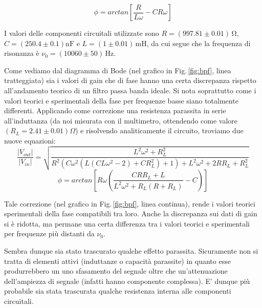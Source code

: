 \begin{equation}
\phi=arctan\left[\frac{R}{L \omega}-C R \omega \right]
\label{eq:bpfPhi}
\end{equation}

\noindent I valori delle componenti circuitali utilizzate sono $R=(997.81 \pm 0.01)\,\si{\ohm}$, $C=(250.4 \pm 0.1)\si{\nano\farad}$ e $L=(1 \pm 0.01)\,\si{\milli\henry}$, da cui segue che la frequenza di risonanza è $\nu_0 = (10060 \pm 50)\,\si{\hertz}$.

Come vediamo dal diagramma di Bode (nel grafico in Fig.$\,$\ref{fig:bpf}, linea tratteggiata) sia i valori di gain che di fase hanno una certa discrepanza rispetto all'andamento teorico di un filtro passa banda ideale. Si nota soprattutto come i valori teorici e sperimentali della fase per frequenze basse siano totalmente differenti.
Applicando come correzione una resistenza parassita in serie all'induttanza (da noi misurata con il multimetro, ottendendo come valore $(R_L=2.41\pm 0.01) \Omega$) e risolvendo analiticamente il circuito, troviamo due nuove equazioni:\\

\noindent
\begin{equation}
\frac{|V_{out}|}{|V_{in}|}=\sqrt{\frac{L^2 \omega ^2+R_L^2}{R^2 \left(C \omega ^2 \left(L \left(C L \omega ^2-2\right)+C R_L^2\right)+1\right)+L^2 \omega ^2+2 R R_L+R_L^2}}
\label{bpfGain_corr}
\end{equation}
\begin{equation}
\phi=arctan\left[R \omega \left(\frac{C R R_L+L}{L^2 \omega ^2+R_L (R+R_L)}-C\right)\right]
\label{bpfPhi_corr}
\end{equation}
\break

\noindent Tale correzione (nel grafico in Fig.$\,$\ref{fig:bpf}, linea continua), rende i valori teorici sperimentali della fase compatibili tra loro. Anche la discrepanza sui dati di gain si è ridotta, ma permane una certa differenza tra i valori teorici e sperimentali per frequenze più distanti da $\nu_0$.

Sembra dunque sia stato trascurato qualche effetto parassita. Sicuramente non si tratta di elementi attivi (induttanze o capacità parassite) in quanto esse produrrebbero un uno sfasamento del segnale oltre che un'attenuazione dell'ampiezza di segnale (infatti hanno componente complessa). E' dunque più probabile sia stata trascurata qualche resistenza interna alle componenti circuitali.